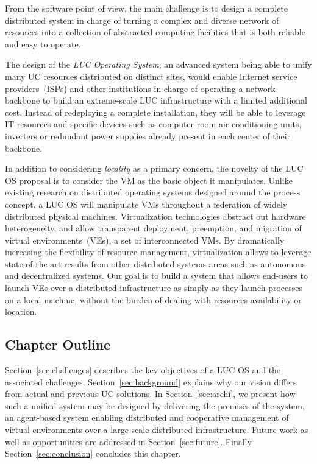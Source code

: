 From the software point of view, the main challenge is to design a complete distributed
system in charge of turning a complex and diverse network of resources into a collection
of abstracted computing facilities that is both reliable and easy to operate.

\begin{svgraybox}
  The design of the \emph{LUC  Operating System},  an advanced system being able to unify many UC
  resources distributed on distinct sites,  would enable Internet service providers~(ISPs)
  and other institutions in charge of operating a network backbone to build an
  extreme-scale LUC infrastructure with a limited additional cost. Instead of redeploying
  a complete installation, they will be able to leverage IT resources and specific devices
  such as computer room air conditioning units, inverters or redundant power supplies
  already present in each center of their backbone.
\end{svgraybox}


\medskip

In addition to considering \emph{locality} as a primary concern, the novelty of the LUC OS
proposal is to consider the VM as the basic object it manipulates.  Unlike existing
research on distributed operating systems designed around the process concept, a LUC OS
will manipulate VMs throughout a federation of widely distributed physical
machines. Virtualization technologies abstract out hardware heterogeneity, and allow
transparent deployment, preemption, and migration of virtual environments~(VEs), \ie a set
of interconnected VMs.  By dramatically increasing the flexibility of resource management,
virtualization allows to leverage state-of-the-art results from other distributed systems
areas such as autonomous and decentralized systems.  Our goal is to build a system that
allows end-users to launch VEs over a distributed infrastructure as simply as they launch
processes on a local machine, \ie without the burden of dealing with resources
availability or location.

\subsection{Chapter Outline} 
Section~\ref{sec:challenges} describes the key objectives of a LUC OS and the associated
challenges.  Section~\ref{sec:background} explains why our vision differs from actual and
previous UC solutions. In Section~\ref{sec:archi}, we present how such a unified system
may be designed by delivering the premises of the \discovery system, an agent-based system
enabling distributed and cooperative management of virtual environments over a large-scale
distributed infrastructure.  Future work as well as opportunities are addressed in
Section~\ref{sec:future}. Finally Section~\ref{sec:conclusion} concludes this chapter.
